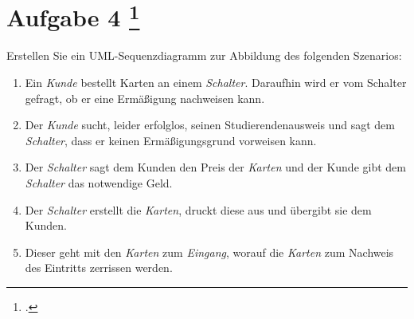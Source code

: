 \documentclass{lehramt-informatik-aufgabe}
\begin{document}
\section{Aufgabe 4
\footcite{examen:66116:2020:03}}

Erstellen Sie ein UML-Sequenzdiagramm zur Abbildung des folgenden
Szenarios:

\begin{enumerate}
\item Ein \emph{Kunde} bestellt Karten an einem \emph{Schalter}.
Daraufhin wird er vom Schalter gefragt, ob er eine Ermäßigung nachweisen
kann.

\item Der \emph{Kunde} sucht, leider erfolglos, seinen
Studierendenausweis und sagt dem \emph{Schalter}, dass er keinen
Ermäßigungsgrund vorweisen kann.

\item Der \emph{Schalter} sagt dem Kunden den Preis der \emph{Karten}
und der Kunde gibt dem \emph{Schalter} das notwendige Geld.

\item Der \emph{Schalter} erstellt die \emph{Karten}, druckt diese aus
und übergibt sie dem Kunden.

\item Dieser geht mit den \emph{Karten} zum \emph{Eingang}, worauf die
\emph{Karten} zum Nachweis des Eintritts zerrissen werden.
\end{enumerate}
\end{document}
